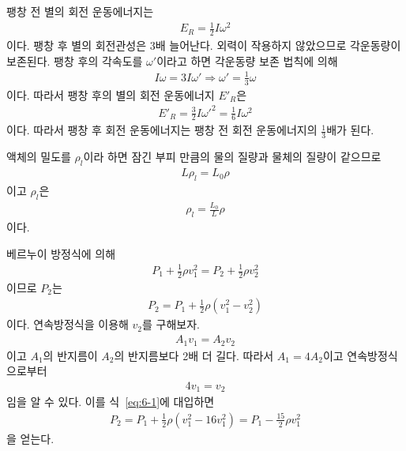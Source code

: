 \documentclass[floatfix,nofootinbib,superscriptaddress,fleqn]{revtex4-2}
\begin{document}
 

\vspace{0.5cm} 

팽창 전 별의 회전 운동에너지는
\begin{align}
  E_R = \frac{1}{2}I\omega^2
\end{align}
이다. 팽창 후 별의 회전관성은 3배 늘어난다. 외력이 작용하지 않았으므로
각운동량이 보존된다. 팽창 후의 각속도를 $\omega'$이라고 하면 각운동량 보존 법칙에 의해
\begin{align}
  I\omega = 3I\omega' \Longrightarrow \omega' =\frac{1}{3}\omega
\end{align}
이다. 따라서 팽창 후의 별의 회전 운동에너지 $E'_R$은
\begin{align}
  E'_R=\frac{3}{2}I\omega'^2=\frac{1}{6}I\omega^2
\end{align}
이다. 따라서 팽창 후 회전 운동에너지는 팽창 전 회전 운동에너지의 $\frac{1}{3}$배가 된다.

 

\vspace{0.5cm} 
액체의 밀도를 $\rho_l$이라 하면 잠긴 부피 만큼의 물의 질량과
물체의 질량이 같으므로
\begin{align}
  L \rho_l = L_0 \rho
\end{align}
이고 $\rho_l$은
\begin{align}
  \rho_l = \frac{L_0}{L}\rho
\end{align}
이다.
\vspace{0.5cm}
 


베르누이 방정식에 의해
\begin{align}
  P_1 + \frac{1}{2}\rho v_1^2
  =  P_2 + \frac{1}{2}\rho v_2^2
\end{align}
이므로 $P_2$는
\begin{align}\label{eq:6-1}
  P_2 = P_1 + \frac{1}{2}\rho\left(v_1^2-v_2^2\right)
\end{align}
이다. 연속방정식을 이용해 $v_2$를 구해보자. 
\begin{align}
  A_1 v_1 = A_2 v_2
\end{align}
이고 $A_1$의 반지름이 $A_2$의 반지름보다 2배 더 길다. 따라서 $A_1 = 4A_2$이고
연속방정식으로부터
\begin{align}
  4v_1 = v_2
\end{align}
 임을 알 수 있다. 이를 식~\eqref{eq:6-1}에 대입하면
 \begin{align}
  P_2 = P_1 + \frac{1}{2}\rho\left(v_1^2-16v_1^2\right)
  =P_1 - \frac{15}{2}\rho v_1^2
 \end{align}
을 얻는다.
\end{document}
